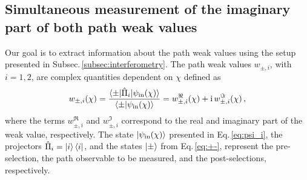 \documentclass[12pt]{iopart}
\newcommand{\eq}{Eq.}
\newcommand{\I}{\mathrm{i}}
\begin{document}
\subsection{Simultaneous measurement of the imaginary part of both path weak values}
Our goal is to extract information about the path weak values using the setup presented in 
Subsec.\,\ref{subsec:interferometry}. The path weak values $w_{\pm,i}$, with $i=1,2$, are complex quantities dependent on $\chi$ defined as
\begin{align}
    w_{\pm,i}(\chi) = \frac{\braket{\pm|\hat{\Pi}_i|\psi_\mathrm{in}(\chi)}}{\braket{\pm|\psi_\mathrm{in}(\chi)}} = w^\Re_{\pm,i}(\chi)+\I\, w^\Im_{\pm,i}(\chi) \, , \label{eq:wv}
\end{align}
where the terms $w^\Re_{\pm,i}$ and $w^\Im_{\pm,i}$ correspond to the real and imaginary part of the weak value, respectively. The state $\ket{\psi_\mathrm{in}(\chi)}$ presented in \eq\,\eqref{eq:psi_i}, the projectors $\hat{\Pi}_i = \ket{i}\bra{i}$, and the states $\ket{\pm}$ from \eq\,\eqref{eq:+-}, represent the pre-selection, the path observable to be measured, and the post-selections, respectively. 
\end{document}
